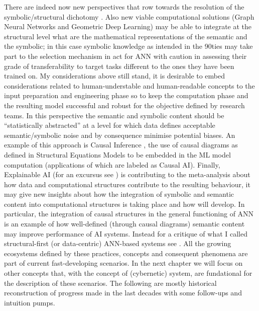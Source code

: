 \documentclass[14pt]{extarticle}
\begin{document}
\newline
There are indeed now new perspectives that row towards the resolution of the symbolic/structural dichotomy \cite{Cheng2016,honavar1995}. Also new viable computational solutions (Graph Neural Networks and Geometric Deep Learning) may be able to integrate at the structural level what are the mathematical representations of the semantic and the symbolic; in this case symbolic knowledge as intended in the 90ties may take part to the selection mechanism in act for ANN with caution in assessing their grade of transferability to target tasks different to the ones they have been trained on. My considerations above still stand, it is desirable to embed considerations related to human-understable and human-readable concepts to the input preparation and engineering phase so to keep the computation phase and the resulting model successful and robust for the objective defined by research teams. In this perspective the semantic and symbolic content should be “statistically abstracted” at a level for which data defines acceptable semantic/symbolic noise and by consequence minimise potential biases. An example of this approach is Causal Inference \cite{pearl2009causality}, the use of causal diagrams as defined in Structural Equations Models to be embedded in the ML model computation (applications of which are labeled as Causal AI).
\newline
Finally, Explainable AI (for an excursus see \cite{savagebreaking}) is contributing to the meta-analysis about how data and computational structures contribute to the resulting behaviour, it may give new insights about how the integration of symbolic and semantic content into computational structures is taking place and how will develop. In particular, the integration of causal structures in the general functioning of ANN is an example of how well-defined (through causal diagrams) semantic content may improve performance of AI systems. Instead for a critique of what I called structural-first (or data-centric) ANN-based systems see \cite{Pearl2018}.
\newline
\hspace*{15mm}All the growing ecosystems defined by these practices, concepts and consequent phenomena are part of current fast-developing scenarios. In the next chapter we will focus on other concepts that, with the concept of (cybernetic) system, are fundational for the description of these scenarios. The following are mostly historical reconstruction of progress made in the last decades with some follow-ups and intuition pumps.
\end{document}
